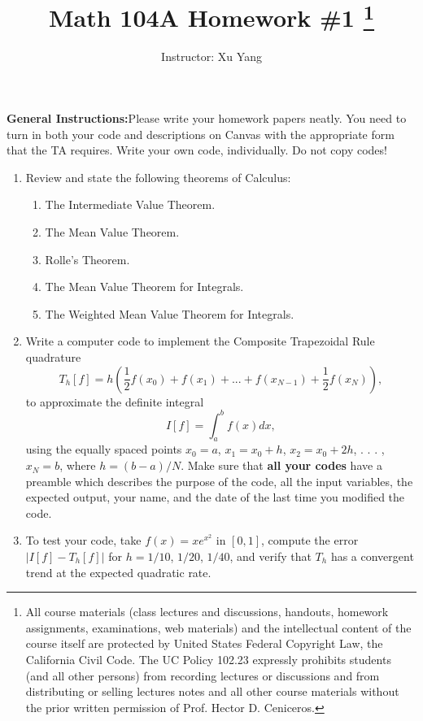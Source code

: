 \documentclass[11pt]{article}
\title{Math 104A Homework \#1 \thanks{All course materials (class lectures and discussions, handouts, homework assignments, examinations, web materials) and the intellectual content of the course itself are protected by United States Federal Copyright Law, the California Civil Code. The UC Policy 102.23 expressly prohibits students (and all other persons) from recording lectures or discussions and from distributing or selling lectures notes and all other course materials without the prior written permission of Prof. Hector D. Ceniceros.}}
\author{Instructor: Xu Yang}
\date{}
\begin{document}
\maketitle
\vspace{\baselineskip}

\noindent\textbf{General Instructions:}\quad Please write your homework papers neatly. You need to turn in both your code and descriptions on Canvas with the appropriate form that the TA requires. Write your own code, individually. Do not copy codes!

\begin{enumerate}
\item Review and state the following theorems of Calculus:
  \begin{enumerate}
  \item The Intermediate Value Theorem.
  \item The Mean Value Theorem.
  \item Rolle's Theorem.
  \item The Mean Value Theorem for Integrals.
  \item The Weighted Mean Value Theorem for Integrals.
  \end{enumerate}

\item Write a computer code to implement the Composite Trapezoidal Rule quadrature
\begin{equation}
T_h[f] = h\left(\frac{1}{2}f(x_0) + f(x_1) + ... + f(x_{N-1}) + \frac{1}{2}f(x_N)\right),
\end{equation}
to approximate the definite integral
\begin{equation}
I[f] = \int_a^b f(x)dx,
\end{equation}
using the equally spaced points $x_0 = a$, $x_1 = x_0 + h$, $x_2 = x_0 + 2h$, . . . , $x_N = b$, where $h = (b-a)/N$. Make sure that \textbf{all your codes} have a preamble which describes the purpose of the code, all the input variables, the expected output, your name, and the date of the last time you modified the code.

\item To test your code, take $f(x) = xe^{x^2}$ in $[0,1]$, compute the error $|I[f] - T_h[f]|$ for $h = 1/10$, $1/20$, $1/40$, and verify that $T_h$ has a convergent trend at the expected quadratic rate.


\end{enumerate}
\end{document}
